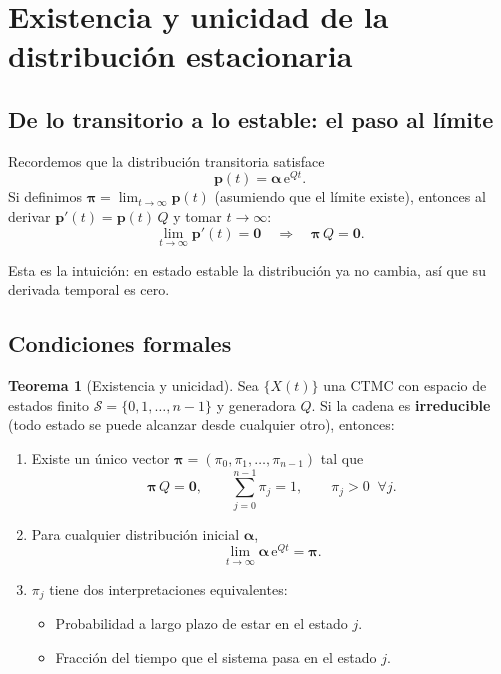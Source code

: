 \documentclass[11pt,a4paper]{article}
\theoremstyle{definition}
\newtheorem{teorema}{Teorema}[section]
\theoremstyle{remark}
\newcommand{\e}{\mathrm{e}}
\begin{document}
\section{Existencia y unicidad de la distribución estacionaria}

\subsection{De lo transitorio a lo estable: el paso al límite}

Recordemos que la distribución transitoria satisface
\[
  \boldsymbol{p}(t) = \boldsymbol{\alpha}\,\e^{Qt}.
\]
Si definimos $\boldsymbol{\pi} = \lim_{t\to\infty}\boldsymbol{p}(t)$
(asumiendo que el límite existe), entonces al derivar
$\boldsymbol{p}'(t) = \boldsymbol{p}(t)\,Q$ y tomar $t\to\infty$:
\[
  \lim_{t\to\infty}\boldsymbol{p}'(t) = \boldsymbol{0}
  \quad\Longrightarrow\quad
  \boldsymbol{\pi}\,Q = \boldsymbol{0}.
\]

Esta es la intuición: en estado estable la distribución ya no cambia,
así que su derivada temporal es cero.

\subsection{Condiciones formales}

\begin{teorema}[Existencia y unicidad]
\label{teo:existencia}
Sea $\{X(t)\}$ una CTMC con espacio de estados finito
$\mathcal{S} = \{0,1,\dots,n-1\}$ y generadora $Q$.  Si la cadena es
\textbf{irreducible} (todo estado se puede alcanzar desde cualquier
otro), entonces:
\begin{enumerate}[nosep]
  \item Existe un único vector $\boldsymbol{\pi} = (\pi_0,\pi_1,\dots,\pi_{n-1})$ tal que
    \[
      \boldsymbol{\pi}\,Q = \boldsymbol{0}, \qquad
      \sum_{j=0}^{n-1}\pi_j = 1, \qquad
      \pi_j > 0 \;\;\forall j.
    \]
  \item Para cualquier distribución inicial $\boldsymbol{\alpha}$,
    \[
      \lim_{t\to\infty}\boldsymbol{\alpha}\,\e^{Qt} = \boldsymbol{\pi}.
    \]
  \item $\pi_j$ tiene dos interpretaciones equivalentes:
    \begin{itemize}[nosep]
      \item Probabilidad a largo plazo de estar en el estado $j$.
      \item Fracción del tiempo que el sistema pasa en el estado $j$.
    \end{itemize}
\end{enumerate}
\end{teorema}
\end{document}
